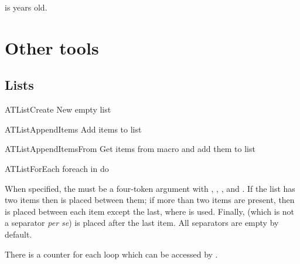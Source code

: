 \documentclass[a4paper, 11pt]{article}
\begin{document}
\begin{PDExample}
      is  years old.
\end{PDExample}


\section{Other tools}

\subsection{Lists}

\begin{Macrodef}{ATListCreate}{}{}
    New empty list
\end{Macrodef}

\begin{Macrodef}{ATListAppendItems}{}{}
    Add items to list
\end{Macrodef}


\begin{Macrodef}{ATListAppendItemsFrom}{}{}
    Get items from macro and add them to list
\end{Macrodef}

\begin{Macrodef}{ATListForEach}{}{}
    foreach  in  do 

    When specified, the  must be a four-token argument with , , , and . If the list has two items then  is placed between them; if more than two items are present, then  is placed between each item except the last, where  is used. Finally,  (which is not a separator \textit{per se}) is placed after the last item. All separators are empty by default.

    There is a counter for each loop which can be accessed by .
\end{Macrodef}
\end{document}
